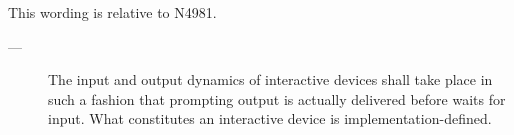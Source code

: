 \newpage
{}\label{api}

This wording is relative to N4981.\cite{Standard}




\begin{description}
    \item[---] The input and output dynamics of interactive devices shall take
               place in such a fashion that prompting output is actually
               delivered before  waits
               for input. What constitutes an interactive device is
               implementation-defined.
\end{description}


